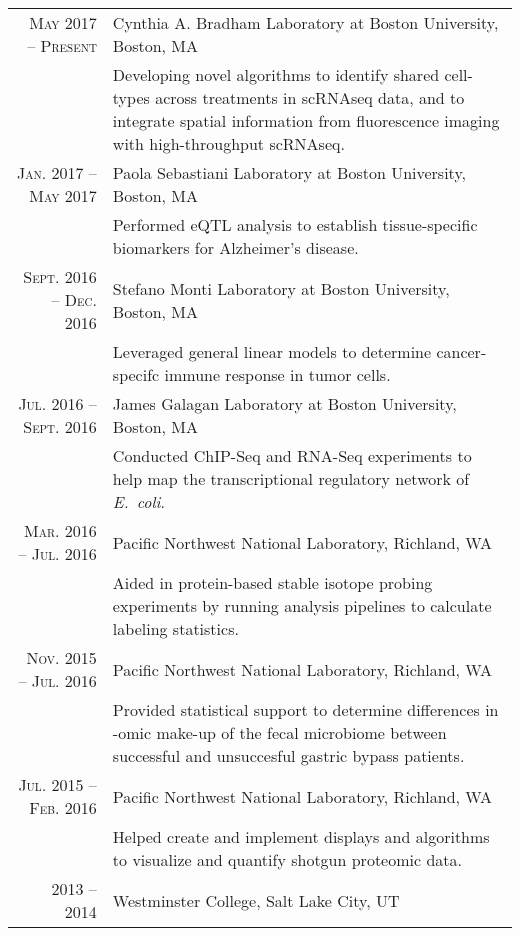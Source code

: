 \documentclass[a4paper,10pt]{article}
\begin{document}
\section{\color{linkcolour}{Research}}
\begin{tabular}{rp{10cm}}
\textsc{May 2017 -- Present} & Cynthia A. Bradham Laboratory at Boston University, Boston, MA \\
	& \footnotesize{Developing novel algorithms to identify shared cell-types across treatments
					in scRNAseq data, and to integrate spatial information from fluorescence
					imaging with high-throughput scRNAseq.} \\
\textsc{Jan. 2017 -- May 2017} & Paola Sebastiani Laboratory at Boston University, Boston, MA \\
	& \footnotesize{Performed eQTL analysis to establish tissue-specific biomarkers for 
	                Alzheimer's disease.} \\
\textsc{Sept. 2016 -- Dec. 2016} & Stefano Monti Laboratory at Boston University, Boston, MA \\
	& \footnotesize{Leveraged general linear models to determine cancer-specifc immune response in
	                tumor cells.} \\
\textsc{Jul. 2016 -- Sept. 2016} & James Galagan Laboratory at Boston University, Boston, MA \\
& \footnotesize{Conducted ChIP-Seq and RNA-Seq experiments to help map the transcriptional
	            regulatory network of \emph{E.\ coli}.} \\
\textsc{Mar. 2016 -- Jul. 2016} & Pacific Northwest National Laboratory, Richland, WA \\
& \footnotesize{Aided in protein-based stable isotope probing experiments by
                running analysis pipelines to  calculate labeling statistics.} \\
\textsc{Nov. 2015 -- Jul. 2016} & Pacific Northwest National Laboratory, Richland, WA \\
& \footnotesize{Provided statistical support to determine differences in -omic
				make-up of the fecal microbiome between successful and
				unsuccesful gastric bypass patients.} \\
\textsc{Jul. 2015 -- Feb. 2016} & Pacific Northwest National Laboratory, Richland, WA \\
& \footnotesize{Helped create and implement displays and algorithms to visualize
                and quantify shotgun proteomic data.} \\
 \textsc{2013 -- 2014} & Westminster College, Salt Lake City, UT\\

\end{tabular}
\end{document}
